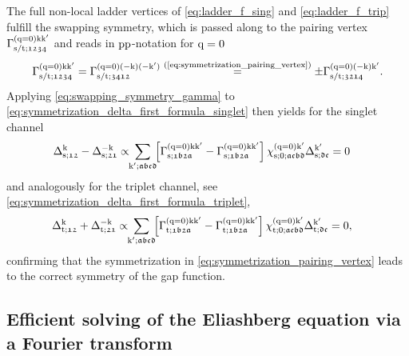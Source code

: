 \documentclass[../../main.tex]{subfiles}
\begin{document}
The full non-local ladder vertices of \eqref{eq:ladder_f_sing} and \eqref{eq:ladder_f_trip} fulfill the swapping symmetry, which is passed along to the pairing vertex $\Gamma^{(\text{q}=0)\text{k}\text{k}'}_{\text{s}/\text{t};\mathfrak{1234}}$ and reads in $\text{pp}$-notation for $\text{q}=0$
\begin{align}\label{eq:swapping_symmetry_gamma}
	\Gamma^{(\text{q}=0)\text{k}\text{k}'}_{\text{s}/\text{t};\mathfrak{1234}}=\Gamma^{(\text{q}=0)(-\text{k})(-\text{k}')}_{\text{s}/\text{t};\mathfrak{3412}}\overset{\text{(\ref{eq:symmetrization_pairing_vertex})}}{=}\pm \Gamma^{(\text{q}=0)(-\text{k})\text{k}'}_{\text{s}/\text{t};\mathfrak{3214}}.
\end{align}
Applying \eqref{eq:swapping_symmetry_gamma} to \eqref{eq:symmetrization_delta_first_formula_singlet} then yields for the singlet channel
\begin{align}
	\Delta_{\text{s};\mathfrak{12}}^{\text{k}}-\Delta_{\text{s};\mathfrak{21}}^{-\text{k}}&\propto\!\!\sum_{\text{k}';\mathfrak{abcd}}\!\! \left [\Gamma^{(\text{q}=0)\text{k}\text{k}'}_{\text{s};\mathfrak{1b2a}}-\Gamma^{(\text{q}=0)\text{k}\text{k}'}_{\text{s};\mathfrak{1b2a}}\right ]\chi^{(\text{q}=0)\text{k}'}_{\text{s};0;\mathfrak{acbd}}\Delta_{\text{s};\mathfrak{dc}}^{\text{k}'}=0
\end{align}
and analogously for the triplet channel, see \eqref{eq:symmetrization_delta_first_formula_triplet},
\begin{align}
	\Delta_{\text{t};\mathfrak{12}}^{\text{k}}+\Delta_{\text{t};\mathfrak{21}}^{-\text{k}}&\propto\!\!\sum_{\text{k}';\mathfrak{abcd}}\!\! \left [\Gamma^{(\text{q}=0)\text{k}\text{k}'}_{\text{t};\mathfrak{1b2a}}-\Gamma^{(\text{q}=0)\text{k}\text{k}'}_{\text{t};\mathfrak{1b2a}}\right ]\chi^{(\text{q}=0)\text{k}'}_{\text{t};0;\mathfrak{acbd}}\Delta_{\text{t};\mathfrak{dc}}^{\text{k}'}=0,
\end{align}
confirming that the symmetrization in \eqref{eq:symmetrization_pairing_vertex} leads to the correct symmetry of the gap function.

\subsection{Efficient solving of the Eliashberg equation via a Fourier transform}
\end{document}
